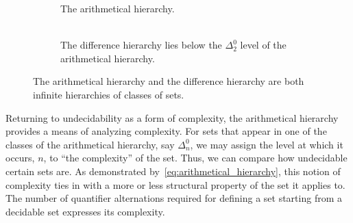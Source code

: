 \begin{figure}
  \centering
  \begin{subfigure}{0.4\textwidth}
    \centering
    \caption{
      The arithmetical hierarchy.
      \\\hspace{0pt} \\\hspace{0pt} %
    }
    \label{fig:arithmetical_hierarchy}
  \end{subfigure}
  \qquad
  \begin{subfigure}{0.4\textwidth}
    \centering
    \caption{
      The difference hierarchy lies below the $\Delta^0_2$ level of the arithmetical hierarchy.
    }
    \label{fig:difference_hierarchy}
  \end{subfigure}
  \caption{
    The arithmetical hierarchy and the difference hierarchy are both infinite hierarchies of classes of sets.
  }
\end{figure}

Returning to undecidability as a form of complexity, the arithmetical hierarchy provides a means of analyzing complexity.
For sets that appear in one of the classes of the arithmetical hierarchy, say $\Delta^0_n$, we may assign the level at which it occurs, $n$, to \enquote{the complexity} of the set.
Thus, we can compare how undecidable certain sets are.
As demonstrated by~\eqref{eq:arithmetical_hierarchy}, this notion of complexity ties in with a more or less structural property of the set it applies to.
The number of quantifier alternations required for defining a set starting from a decidable set expresses its complexity.

